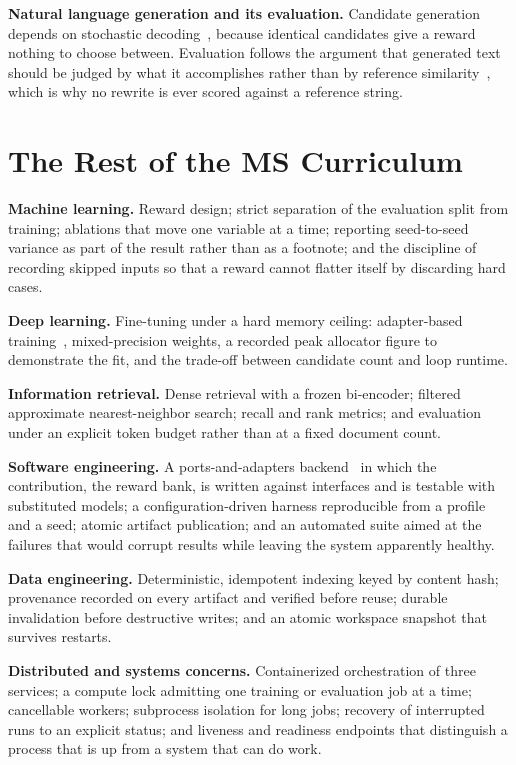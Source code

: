 \documentclass[12pt,letterpaper,oneside]{report}
\begin{document}
\textbf{Natural language generation and its evaluation.} Candidate generation
depends on stochastic decoding~\cite{nucleus}, because identical candidates
give a reward nothing to choose between. Evaluation follows the argument that
generated text should be judged by what it accomplishes rather than by
reference similarity~\cite{hownot}, which is why no rewrite is ever scored
against a reference string.

\section{The Rest of the MS Curriculum}

\textbf{Machine learning.} Reward design; strict separation of the evaluation
split from training; ablations that move one variable at a time; reporting
seed-to-seed variance as part of the result rather than as a footnote; and the
discipline of recording skipped inputs so that a reward cannot flatter itself
by discarding hard cases.

\textbf{Deep learning.} Fine-tuning under a hard memory ceiling: adapter-based
training~\cite{lora,adapters}, mixed-precision weights, a recorded peak
allocator figure to demonstrate the fit, and the trade-off between candidate
count and loop runtime.

\textbf{Information retrieval.} Dense retrieval with a frozen bi-encoder;
filtered approximate nearest-neighbor search; recall and rank metrics; and
evaluation under an explicit token budget rather than at a fixed document
count.

\textbf{Software engineering.} A ports-and-adapters
backend~\cite{cleanarch} in which the contribution, the reward bank, is
written against interfaces and is testable with substituted models; a
configuration-driven harness reproducible from a profile and a seed; atomic
artifact publication; and an automated suite aimed at the failures that would
corrupt results while leaving the system apparently healthy.

\textbf{Data engineering.} Deterministic, idempotent indexing keyed by content
hash; provenance recorded on every artifact and verified before reuse;
durable invalidation before destructive writes; and an atomic workspace
snapshot that survives restarts.

\textbf{Distributed and systems concerns.} Containerized orchestration of three
services; a compute lock admitting one training or evaluation job at a time;
cancellable workers; subprocess isolation for long jobs; recovery of
interrupted runs to an explicit status; and liveness and readiness endpoints
that distinguish a process that is up from a system that can do work.
\end{document}
